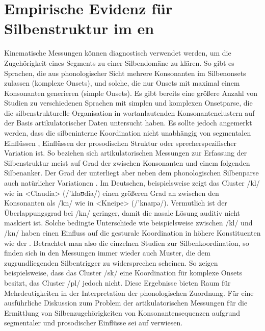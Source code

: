  \largerpage
\section{Empirische Evidenz für Silbenstruktur im en}
\label{sec:0304}

Kinematische Messungen können diagnostisch verwendet werden, um die Zugehörigkeit eines Segments zu einer Silbendomäne zu klären. So gibt es Sprachen, die aus phonologischer Sicht mehrere Konsonanten im Silbenonsets zulassen (komplexe Onsets), und solche, die nur Onsets mit maximal einem Konsonanten generieren (simple Onsets). Es gibt bereits eine größere Anzahl von Studien zu verschiedenen Sprachen mit simplen und komplexen Onsetparse, die die silbenstrukturelle Organisation in wortanlautenden Konsonantenclustern auf der Basis artikulatorischer Daten untersucht haben. Es sollte jedoch angemerkt werden, dass die silbeninterne Koordination nicht unabhängig von segmentalen Einflüssen \citep{Brunner2014, Marin2013, Marin2014, Pouplier2012}, Einflüssen der prosodischen Struktur \citep{Shaw2009, Shaw2011, Gafos2014, Hermes2017} oder sprecherspezifischer Variation ist. So beziehen sich artikulatorischen Messungen zur Erfassung der Silbenstruktur meist auf Grad der  zwischen Konsonanten und einem folgenden Silbenanker. Der Grad der  unterliegt aber neben dem phonologischen Silbenparse auch natürlicher Variationen \citep{Goldstein2007a}. Im Deutschen, beispielsweise zeigt das Cluster /kl/ wie in <Claudia> (/’klaʊdia/) einen größeren Grad an  zwischen den Konsonanten als /kn/ wie in <Kneipe> (/’knaɪpə/). Vermutlich ist der Überlappungsgrad bei /kn/ geringer, damit die nasale Lösung auditiv nicht maskiert ist. Solche  bedingte Unterschiede wie beispielsweise zwischen /kl/ und /kn/ haben einen Einfluss auf die gesturale Koordination in höhere Konstituenten wie der . Betrachtet man also die einzelnen Studien zur Silbenkoordination, so finden sich in den Messungen immer wieder auch Muster, die dem zugrundliegenden Silbentrigger zu widersprechen scheinen. So zeigen \citet{Brunner2014} beispielsweise, dass das Cluster /sk/ eine Koordination für komplexe Onsets besitzt, das Cluster /pl/ jedoch nicht. Diese Ergebnisse bieten Raum für Mehrdeutigkeiten in der Interpretation der phonologischen Zuordnung. Für eine ausführliche Diskussion zum Problem der artikulatorischen Messungen für die Ermittlung von Silbenzugehörigkeiten von Konsonantensequenzen aufgrund segmentaler und prosodischer Einflüsse sei auf \citet{Hermes2017} verwiesen.

